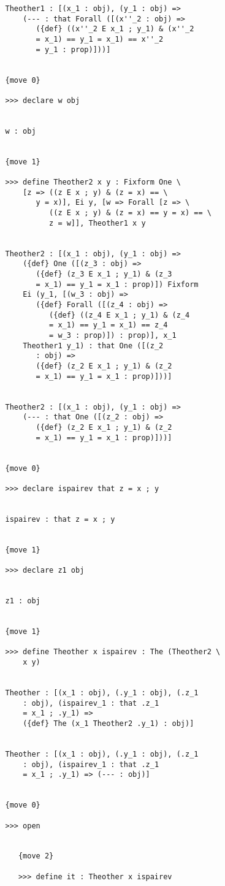 \documentclass[12pt]{article}
\begin{document}
\begin{verbatim}
   Theother1 : [(x_1 : obj), (y_1 : obj) => 
       (--- : that Forall ([(x''_2 : obj) => 
          ({def} ((x''_2 E x_1 ; y_1) & (x''_2 
          = x_1) == y_1 = x_1) == x''_2 
          = y_1 : prop)]))]


   {move 0}

   >>> declare w obj


   w : obj


   {move 1}

   >>> define Theother2 x y : Fixform One \
       [z => ((z E x ; y) & (z = x) == \
          y = x)], Ei y, [w => Forall [z => \
             ((z E x ; y) & (z = x) == y = x) == \
             z = w]], Theother1 x y


   Theother2 : [(x_1 : obj), (y_1 : obj) => 
       ({def} One ([(z_3 : obj) => 
          ({def} (z_3 E x_1 ; y_1) & (z_3 
          = x_1) == y_1 = x_1 : prop)]) Fixform 
       Ei (y_1, [(w_3 : obj) => 
          ({def} Forall ([(z_4 : obj) => 
             ({def} ((z_4 E x_1 ; y_1) & (z_4 
             = x_1) == y_1 = x_1) == z_4 
             = w_3 : prop)]) : prop)], x_1 
       Theother1 y_1) : that One ([(z_2 
          : obj) => 
          ({def} (z_2 E x_1 ; y_1) & (z_2 
          = x_1) == y_1 = x_1 : prop)]))]


   Theother2 : [(x_1 : obj), (y_1 : obj) => 
       (--- : that One ([(z_2 : obj) => 
          ({def} (z_2 E x_1 ; y_1) & (z_2 
          = x_1) == y_1 = x_1 : prop)]))]


   {move 0}

   >>> declare ispairev that z = x ; y


   ispairev : that z = x ; y


   {move 1}

   >>> declare z1 obj


   z1 : obj


   {move 1}

   >>> define Theother x ispairev : The (Theother2 \
       x y)


   Theother : [(x_1 : obj), (.y_1 : obj), (.z_1 
       : obj), (ispairev_1 : that .z_1 
       = x_1 ; .y_1) => 
       ({def} The (x_1 Theother2 .y_1) : obj)]


   Theother : [(x_1 : obj), (.y_1 : obj), (.z_1 
       : obj), (ispairev_1 : that .z_1 
       = x_1 ; .y_1) => (--- : obj)]


   {move 0}

   >>> open


      {move 2}

      >>> define it : Theother x ispairev



\end{verbatim}
\end{document}
